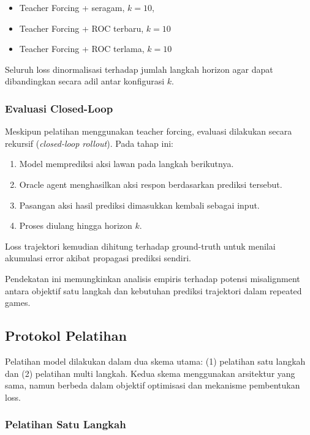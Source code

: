 \begin{itemize}
    \item Teacher Forcing + seragam, $k = 10$, 
    \item Teacher Forcing + ROC terbaru, $k = 10$
    \item Teacher Forcing + ROC terlama, $k = 10$
\end{itemize}

Seluruh loss dinormalisasi terhadap jumlah langkah horizon agar dapat dibandingkan secara adil antar konfigurasi $k$.

\subsubsection{Evaluasi Closed-Loop}

Meskipun pelatihan menggunakan teacher forcing, evaluasi dilakukan secara rekursif (\textit{closed-loop rollout}). Pada tahap ini:

\begin{enumerate}
    \item Model memprediksi aksi lawan pada langkah berikutnya.
    \item Oracle agent menghasilkan aksi respon berdasarkan prediksi tersebut.
    \item Pasangan aksi hasil prediksi dimasukkan kembali sebagai input.
    \item Proses diulang hingga horizon $k$.
\end{enumerate}

Loss trajektori kemudian dihitung terhadap ground-truth untuk menilai akumulasi error akibat propagasi prediksi sendiri.

Pendekatan ini memungkinkan analisis empiris terhadap potensi misalignment antara objektif satu langkah dan kebutuhan prediksi trajektori dalam repeated games.

\subsection{Protokol Pelatihan}

Pelatihan model dilakukan dalam dua skema utama: (1) pelatihan satu langkah dan (2) pelatihan multi langkah. Kedua skema menggunakan arsitektur yang sama, namun berbeda dalam objektif optimisasi dan mekanisme pembentukan loss.

\subsubsection{Pelatihan Satu Langkah}

